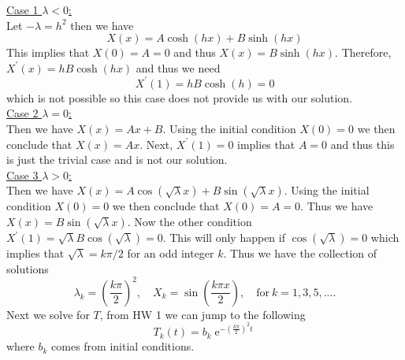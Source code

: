 \documentclass[10pt]{amsart}
\DeclareMathOperator{\E}{e}
\theoremstyle{nonumberplain}
\begin{document}
\begin{enumerate}[label={\bf {\arabic*}:}]
\noindent
\underline{Case 1 $\lambda < 0$:} \\
Let $-\lambda = h^2$ then we have
$$
X(x) = A \cosh (hx) + B \sinh (hx)
$$
This implies that $X(0) = A = 0$ and thus $X(x) = B\sinh(hx)$.
Therefore,  $X^\prime(x) = hB\cosh(hx)$ and thus we need
$$
X^\prime(1) = hB\cosh(h) = 0
$$
which is not possible so this case does not provide us with our solution. \\

\noindent
\underline{Case 2 $\lambda = 0$:} \\
Then we have $X(x) = Ax + B$.
Using the initial condition $X(0) = 0$ we then conclude that $X(x) = Ax$.
Next, $X^\prime(1) = 0$ implies that $A = 0$ and thus this is just the trivial case and is not our solution. \\

\noindent
\underline{Case 3 $\lambda > 0$:} \\
Then we have $X(x) = A\cos (\sqrt \lambda x) + B\sin (\sqrt \lambda x)$.
Using the initial condition $X(0) = 0$ we then conclude that $X(0) = A = 0$.
Thus we have $X(x) = B\sin(\sqrt \lambda x)$.
Now the other condition $X^\prime(1) = \sqrt \lambda B \cos(\sqrt \lambda) = 0$.
This will only happen if $\cos(\sqrt \lambda) = 0$ which implies that $\sqrt \lambda = k\pi/2$ for an odd integer $k$.
Thus we have the collection of solutions
$$
\lambda_k = \left(\frac {k \pi} 2 \right)^2, \quad X_k = \sin \left( \frac {k \pi x}{2}\right), \quad \text{for}\: k = 1, 3, 5, ....
$$
Next we solve for $T$, from HW 1 we can jump to the following
$$
T_k(t) = b_k\E^{- \left( \frac {k \pi} 2 \right)^2 t}
$$
where $b_k$ comes from initial conditions. \\


\end{enumerate}
\end{document}
